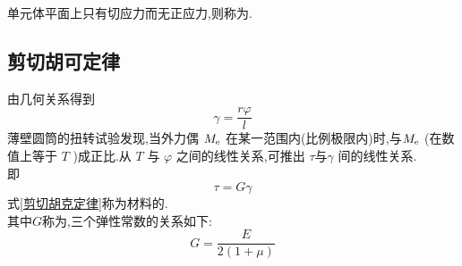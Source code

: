 \begin{definition}[纯剪切单元体]
	单元体平面上只有切应力而无正应力,则称为.
\end{definition}

\subsection{剪切胡可定律}
\begin{theorem}[剪切胡可定律]
	由几何关系得到
	$$
	\gamma = \frac{r \varphi}{l}
	$$
	薄壁圆筒的扭转试验发现,当外力偶 $M_{\text{e}}$ 在某一范围内(比例极限内)时,与$M_{\text{e}}$ (在数值上等于 $T$ )成正比.从 $T$ 与 $\varphi$ 之间的线性关系,可推出 $\tau$与$\gamma$ 间的线性关系.\\
	即
	\begin{equation}
		\tau = G\gamma
		\label{剪切胡克定律}
	\end{equation}
	式\eqref{剪切胡克定律}称为材料的.\\
	其中$G$称为,三个弹性常数的关系如下:
	\begin{equation}
		G=\frac{E}{2(1+\mu)}
	\end{equation}
\end{theorem}




















